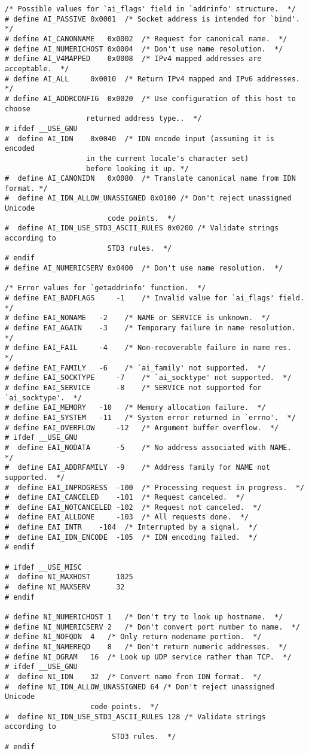 \documentclass{article}
\begin{document}
\begin{lstlisting}
/* Possible values for `ai_flags' field in `addrinfo' structure.  */
# define AI_PASSIVE	0x0001	/* Socket address is intended for `bind'.  */
# define AI_CANONNAME	0x0002	/* Request for canonical name.  */
# define AI_NUMERICHOST	0x0004	/* Don't use name resolution.  */
# define AI_V4MAPPED	0x0008	/* IPv4 mapped addresses are acceptable.  */
# define AI_ALL		0x0010	/* Return IPv4 mapped and IPv6 addresses.  */
# define AI_ADDRCONFIG	0x0020	/* Use configuration of this host to choose
				   returned address type..  */
# ifdef __USE_GNU
#  define AI_IDN	0x0040	/* IDN encode input (assuming it is encoded
				   in the current locale's character set)
				   before looking it up. */
#  define AI_CANONIDN	0x0080	/* Translate canonical name from IDN format. */
#  define AI_IDN_ALLOW_UNASSIGNED 0x0100 /* Don't reject unassigned Unicode
					    code points.  */
#  define AI_IDN_USE_STD3_ASCII_RULES 0x0200 /* Validate strings according to
						STD3 rules.  */
# endif
# define AI_NUMERICSERV	0x0400	/* Don't use name resolution.  */

/* Error values for `getaddrinfo' function.  */
# define EAI_BADFLAGS	  -1	/* Invalid value for `ai_flags' field.  */
# define EAI_NONAME	  -2	/* NAME or SERVICE is unknown.  */
# define EAI_AGAIN	  -3	/* Temporary failure in name resolution.  */
# define EAI_FAIL	  -4	/* Non-recoverable failure in name res.  */
# define EAI_FAMILY	  -6	/* `ai_family' not supported.  */
# define EAI_SOCKTYPE	  -7	/* `ai_socktype' not supported.  */
# define EAI_SERVICE	  -8	/* SERVICE not supported for `ai_socktype'.  */
# define EAI_MEMORY	  -10	/* Memory allocation failure.  */
# define EAI_SYSTEM	  -11	/* System error returned in `errno'.  */
# define EAI_OVERFLOW	  -12	/* Argument buffer overflow.  */
# ifdef __USE_GNU
#  define EAI_NODATA	  -5	/* No address associated with NAME.  */
#  define EAI_ADDRFAMILY  -9	/* Address family for NAME not supported.  */
#  define EAI_INPROGRESS  -100	/* Processing request in progress.  */
#  define EAI_CANCELED	  -101	/* Request canceled.  */
#  define EAI_NOTCANCELED -102	/* Request not canceled.  */
#  define EAI_ALLDONE	  -103	/* All requests done.  */
#  define EAI_INTR	  -104	/* Interrupted by a signal.  */
#  define EAI_IDN_ENCODE  -105	/* IDN encoding failed.  */
# endif

# ifdef __USE_MISC
#  define NI_MAXHOST      1025
#  define NI_MAXSERV      32
# endif

# define NI_NUMERICHOST	1	/* Don't try to look up hostname.  */
# define NI_NUMERICSERV 2	/* Don't convert port number to name.  */
# define NI_NOFQDN	4	/* Only return nodename portion.  */
# define NI_NAMEREQD	8	/* Don't return numeric addresses.  */
# define NI_DGRAM	16	/* Look up UDP service rather than TCP.  */
# ifdef __USE_GNU
#  define NI_IDN	32	/* Convert name from IDN format.  */
#  define NI_IDN_ALLOW_UNASSIGNED 64 /* Don't reject unassigned Unicode
					code points.  */
#  define NI_IDN_USE_STD3_ASCII_RULES 128 /* Validate strings according to
					     STD3 rules.  */
# endif


\end{lstlisting}
\end{document}

